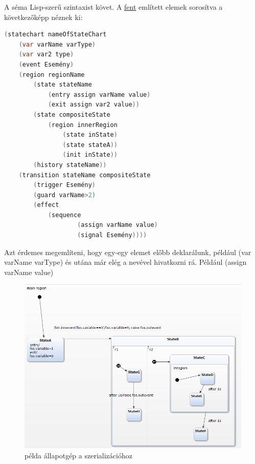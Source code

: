 A séma Lisp-szerű szintaxist követ. A \hyperref[sec:thetaleiras]{fent} említett elemek sorosítva a következőképp néznek ki:

\begin{lstlisting}[language=java,breaklines=true]
(statechart nameOfStateChart
	(var varName varType)
	(var var2 type)
	(event Esemény)
	(region regionName
		(state stateName
			(entry assign varName value)
			(exit assign var2 value))
		(state compositeState
			(region innerRegion
				(state inState)
				(state stateA))
				(init inState))
		(history stateName))
	(transition stateName compositeState
		(trigger Esemény)
		(guard varName>2)
		(effect 
			(sequence
					(assign varName value)
					(signal Esemény))))
\end{lstlisting}

Azt érdemes megemlíteni, hogy egy-egy elemet előbb deklarálunk, például (var varName varType) és utána már elég a nevével hivatkozni rá. Például (assign varName value)

\begin{figure} [!ht]
	\centering
	\includegraphics[width=150mm, keepaspectratio]{figures/serializeexample.png}
	\caption{\label{fig:serializeexample}példa állapotgép a szerializációhoz}
\end{figure}

